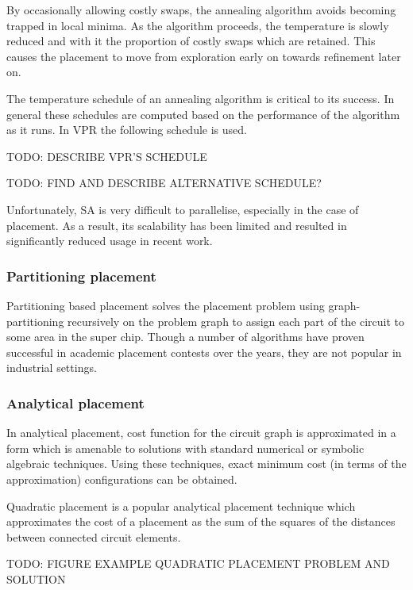 				By occasionally allowing costly swaps, the annealing algorithm avoids
				becoming trapped in local minima. As the algorithm proceeds, the
				temperature is slowly reduced and with it the proportion of costly
				swaps which are retained. This causes the placement to move from
				exploration early on towards refinement later on.
				
				The temperature schedule of an annealing algorithm is critical to its
				success. In general these schedules are computed based on the
				performance of the algorithm as it runs. In VPR the following schedule
				is used.
				
				TODO: DESCRIBE VPR'S SCHEDULE
				
				TODO: FIND AND DESCRIBE ALTERNATIVE SCHEDULE?
				
				Unfortunately, SA is very difficult to parallelise, especially in the
				case of placement. As a result, its scalability has been limited and
				resulted in significantly reduced usage in recent work.
			
			\subsubsection{Partitioning placement}
				
				Partitioning based placement solves the placement problem using
				graph-partitioning recursively on the problem graph to assign each part
				of the circuit to some area in the super chip. Though a number of
				algorithms have proven successful in academic placement contests over
				the years, they are not popular in industrial settings.
			
			\subsubsection{Analytical placement}
				
				In analytical placement, cost function for the circuit graph is
				approximated in a form which is amenable to solutions with standard
				numerical or symbolic algebraic techniques. Using these techniques,
				exact minimum cost (in terms of the approximation) configurations can
				be obtained.
				
				Quadratic placement is a popular analytical placement technique which
				approximates the cost of a placement as the sum of the squares of the
				distances between connected circuit elements.
				
				TODO: FIGURE EXAMPLE QUADRATIC PLACEMENT PROBLEM AND SOLUTION
				
